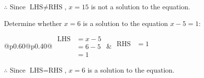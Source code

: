 \documentclass[12pt]{article}
\newcounter{minipagecount}
\begin{document}
\begin{multicols}{2}
\begin{minipage}[t]{0.40\textwidth}
    \noindent \(\therefore\) Since \(\text{LHS} \neq \text{RHS}\), \(x = 15\) is not  a solution to the equation.

\end{minipage}

 \vspace*{16pt}
\noindent{(\theminipagecount)}\hspace{0.1mm} %
\begin{minipage}[t]{0.40\textwidth} %

    \noindent Determine whether \(x = 6\) is a solution to the equation \(x - 5 = 1\):
    \vspace{4pt}  %

    \noindent
    \renewcommand{\arraystretch}{1.3} %
    \begin{tabular}{@{}p{0.60\linewidth}@{}p{0.40\linewidth}@{}}
        \(\begin{aligned}
            \text{LHS} &= x - 5 \\
                    &= 6 - 5 \\
                    &= 1
        \end{aligned}\) &
        \(\begin{aligned}
            \text{RHS} &= 1\\
                    & \\
                    &
        \end{aligned}\)
    \end{tabular}
    \renewcommand{\arraystretch}{1.0} %
    \vspace{2pt}  %

    \noindent \(\therefore\) Since \(\text{LHS} = \text{RHS}\), \(x = 6\) is  a solution to the equation.

\end{minipage}

 \vspace*{16pt}
\noindent{(\theminipagecount)}\hspace{0.1mm} %
\begin{minipage}[t]{0.40\textwidth} %


\end{minipage}
\end{multicols}
\end{document}

